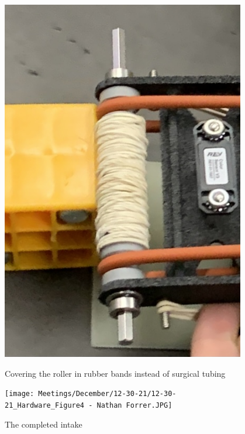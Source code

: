 \begin{figure}[ht]
\centering
\begin{minipage}[b]{.48\textwidth}
  \centering
  \includegraphics[width=0.95\textwidth]{Meetings/December/12-30-21/12-30-21_Hardware_Figure3 - Nathan Forrer.JPG}
  \caption{Covering the roller in rubber bands instead of surgical tubing}
  \label{fig:123021_3}
\end{minipage}%
\hfill%
\begin{minipage}[b]{.48\textwidth}
  \centering
  \texttt{[image: Meetings/December/12-30-21/12-30-21\_Hardware\_Figure4 - Nathan Forrer.JPG]}
  \caption{The completed intake}
  \label{fig:123021_4}
\end{minipage}
\end{figure}

